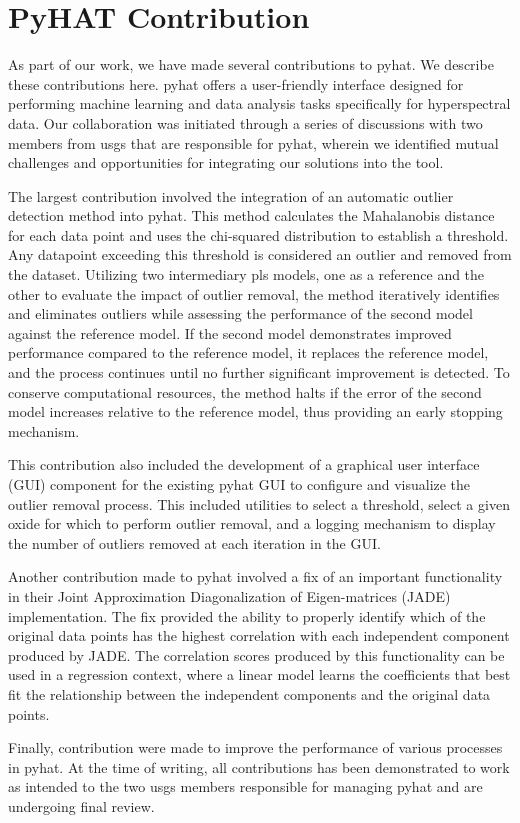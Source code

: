 \section{PyHAT Contribution}\label{sec:pyhat_contribution}
As part of our work, we have made several contributions to \gls{pyhat}. 
We describe these contributions here.
\gls{pyhat} offers a user-friendly interface designed for performing machine learning and data analysis tasks specifically for hyperspectral data.
Our collaboration was initiated through a series of discussions with two members from \gls{usgs} that are responsible for \gls{pyhat}, wherein we identified mutual challenges and opportunities for integrating our solutions into the tool.

The largest contribution involved the integration of an automatic outlier detection method into \gls{pyhat}.
This method calculates the Mahalanobis distance for each data point and uses the chi-squared distribution to establish a threshold.
Any datapoint exceeding this threshold is considered an outlier and removed from the dataset.
Utilizing two intermediary \gls{pls} models, one as a reference and the other to evaluate the impact of outlier removal, the method iteratively identifies and eliminates outliers while assessing the performance of the second model against the reference model. 
If the second model demonstrates improved performance compared to the reference model, it replaces the reference model, and the process continues until no further significant improvement is detected. 
To conserve computational resources, the method halts if the error of the second model increases relative to the reference model, thus providing an early stopping mechanism.

This contribution also included the development of a graphical user interface (GUI) component for the existing \gls{pyhat} GUI to configure and visualize the outlier removal process.
This included utilities to select a threshold, select a given oxide for which to perform outlier removal, and a logging mechanism to display the number of outliers removed at each iteration in the GUI.

Another contribution made to \gls{pyhat} involved a fix of an important functionality in their Joint Approximation Diagonalization of Eigen-matrices (JADE) implementation.
The fix provided the ability to properly identify which of the original data points has the highest correlation with each independent component produced by JADE.
The correlation scores produced by this functionality can be used in a regression context, where a linear model learns the coefficients that best fit the relationship between the independent components and the original data points.

Finally, contribution were made to improve the performance of various processes in \gls{pyhat}.
At the time of writing, all contributions has been demonstrated to work as intended to the two \gls{usgs} members responsible for managing \gls{pyhat} and are undergoing final review.

 